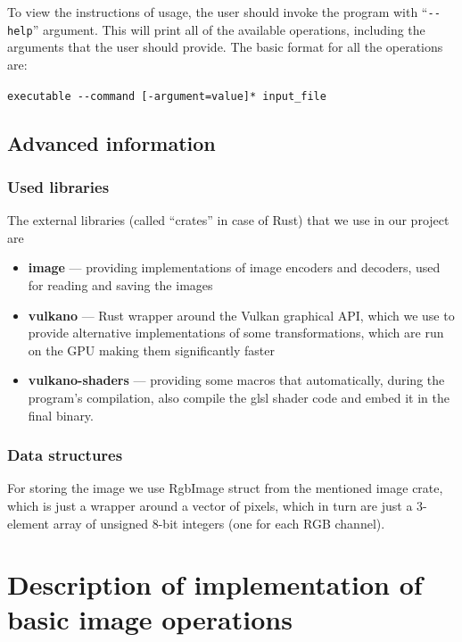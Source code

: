 \documentclass[12pt]{article}
\theoremstyle{definition}
\begin{document}
To view the instructions of usage, the user should invoke the program with ``\lstinline{--help}'' argument.
This will print all of the available operations, including the arguments that the user should provide.
The basic format for all the operations are:
\begin{center}
    \lstinline{executable --command [-argument=value]* input_file}
\end{center}

\subsection{Advanced information}
\subsubsection{Used libraries}
The external libraries (called ``crates'' in case of Rust) that we use in our project are
\begin{itemize}
    \item \textbf{image} --- providing implementations of image encoders and decoders,
          used for reading and saving the images
    \item \textbf{vulkano} --- Rust wrapper around the Vulkan graphical API,
          which we use to provide alternative implementations of some transformations,
          which are run on the GPU making them significantly faster
    \item \textbf{vulkano-shaders} --- providing some macros that automatically,
          during the program's compilation,
          also compile the glsl shader code and embed it in the final binary.
\end{itemize}

\subsubsection{Data structures}
For storing the image we use RgbImage struct from the mentioned image crate,
which is just a wrapper around a vector of pixels, which in turn are just a 3-element array of unsigned 8-bit integers (one for each RGB channel).

\section{Description of implementation of basic image operations}
\end{document}
